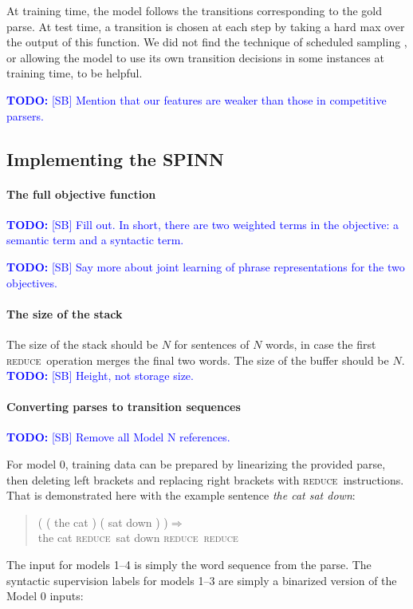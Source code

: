 \documentclass[11pt]{article}
\newcommand\todo[1]{\textcolor{blue}{\textbf{TODO:} #1}}
\newcommand{\reduce}{\textsc{reduce}}
\def\ii#1{\textit{#1}}
\begin{document}
At training time, the model follows the transitions corresponding to the gold parse. At test time, a transition is chosen at each step by taking a hard max over the output of this function. We did not find the technique of scheduled sampling \citep{bengio2015scheduled}, or allowing the model to use its own transition decisions in some instances at training time, to be helpful.

\todo{[SB] Mention that our features are weaker than those in competitive parsers.}

\subsection{Implementing the SPINN}

\paragraph{The full objective function} \todo{[SB] Fill out. In short, there are two weighted terms in the objective: a semantic term and a syntactic term.}

\todo{[SB] Say more about joint learning of phrase representations for the two objectives.}

\paragraph{The size of the stack}
The size of the stack should be $N$ for sentences of $N$ words, in case the first \reduce~operation merges the final two words. The size of the buffer should be $N$. \todo{[SB] Height, not storage size.}

\paragraph{Converting parses to transition sequences}
\todo{[SB] Remove all Model N references.}

For model 0, training data can be prepared by linearizing the provided parse, then deleting left brackets and replacing right brackets with \reduce~instructions. That is demonstrated here with the example sentence \ii{the cat sat down}:

\begin{quote}\small
( ( the cat ) ( sat down ) )$\Rightarrow$\\
the cat \reduce~sat down \reduce~\reduce
\end{quote}

The input for models 1--4 is simply the word sequence from the parse. The syntactic supervision labels for models 1--3 are simply a binarized version of the Model 0 inputs:
\end{document}
